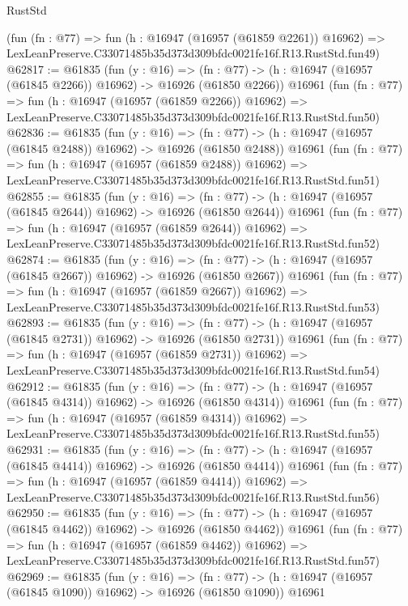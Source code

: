 \begin{lexlean}{RustStd}
\begin{coremodule}
    (fun (fn : @77) =>
    fun (h : @16947 (@16957 (@61859 @2261)) @16962) =>
    LexLeanPreserve.C33071485b35d373d309bfdc0021fe16f.R13.RustStd.fun49)
@62817 := @61835
    (fun (y : @16) =>
    (fn : @77) -> (h : @16947 (@16957 (@61845 @2266)) @16962) -> @16926 (@61850 @2266))
    @16961
    (fun (fn : @77) =>
    fun (h : @16947 (@16957 (@61859 @2266)) @16962) =>
    LexLeanPreserve.C33071485b35d373d309bfdc0021fe16f.R13.RustStd.fun50)
@62836 := @61835
    (fun (y : @16) =>
    (fn : @77) -> (h : @16947 (@16957 (@61845 @2488)) @16962) -> @16926 (@61850 @2488))
    @16961
    (fun (fn : @77) =>
    fun (h : @16947 (@16957 (@61859 @2488)) @16962) =>
    LexLeanPreserve.C33071485b35d373d309bfdc0021fe16f.R13.RustStd.fun51)
@62855 := @61835
    (fun (y : @16) =>
    (fn : @77) -> (h : @16947 (@16957 (@61845 @2644)) @16962) -> @16926 (@61850 @2644))
    @16961
    (fun (fn : @77) =>
    fun (h : @16947 (@16957 (@61859 @2644)) @16962) =>
    LexLeanPreserve.C33071485b35d373d309bfdc0021fe16f.R13.RustStd.fun52)
@62874 := @61835
    (fun (y : @16) =>
    (fn : @77) -> (h : @16947 (@16957 (@61845 @2667)) @16962) -> @16926 (@61850 @2667))
    @16961
    (fun (fn : @77) =>
    fun (h : @16947 (@16957 (@61859 @2667)) @16962) =>
    LexLeanPreserve.C33071485b35d373d309bfdc0021fe16f.R13.RustStd.fun53)
@62893 := @61835
    (fun (y : @16) =>
    (fn : @77) -> (h : @16947 (@16957 (@61845 @2731)) @16962) -> @16926 (@61850 @2731))
    @16961
    (fun (fn : @77) =>
    fun (h : @16947 (@16957 (@61859 @2731)) @16962) =>
    LexLeanPreserve.C33071485b35d373d309bfdc0021fe16f.R13.RustStd.fun54)
@62912 := @61835
    (fun (y : @16) =>
    (fn : @77) -> (h : @16947 (@16957 (@61845 @4314)) @16962) -> @16926 (@61850 @4314))
    @16961
    (fun (fn : @77) =>
    fun (h : @16947 (@16957 (@61859 @4314)) @16962) =>
    LexLeanPreserve.C33071485b35d373d309bfdc0021fe16f.R13.RustStd.fun55)
@62931 := @61835
    (fun (y : @16) =>
    (fn : @77) -> (h : @16947 (@16957 (@61845 @4414)) @16962) -> @16926 (@61850 @4414))
    @16961
    (fun (fn : @77) =>
    fun (h : @16947 (@16957 (@61859 @4414)) @16962) =>
    LexLeanPreserve.C33071485b35d373d309bfdc0021fe16f.R13.RustStd.fun56)
@62950 := @61835
    (fun (y : @16) =>
    (fn : @77) -> (h : @16947 (@16957 (@61845 @4462)) @16962) -> @16926 (@61850 @4462))
    @16961
    (fun (fn : @77) =>
    fun (h : @16947 (@16957 (@61859 @4462)) @16962) =>
    LexLeanPreserve.C33071485b35d373d309bfdc0021fe16f.R13.RustStd.fun57)
@62969 := @61835
    (fun (y : @16) =>
    (fn : @77) -> (h : @16947 (@16957 (@61845 @1090)) @16962) -> @16926 (@61850 @1090))
    @16961

\end{coremodule}
\end{lexlean}
